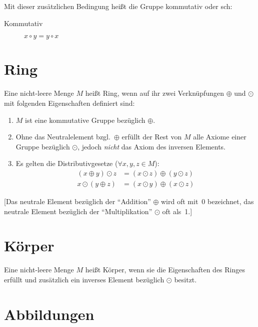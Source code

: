 Mit dieser zusätzlichen Bedingung heißt die Gruppe kommutativ oder sch:
\begin{description}
  \item [Kommutativ] 
	$x\circ y=y\circ x$
\end{description}

\section{Ring}

Eine nicht-leere Menge $M$ heißt Ring, wenn auf ihr zwei Verknüpfungen $\oplus$ und $\odot$ mit folgenden Eigenschaften definiert sind:

\begin{enumerate}
  \item $M$ ist eine kommutative Gruppe bezüglich $\oplus$.
  \item Ohne das Neutralelement bzgl.~$\oplus$ erfüllt der Rest von $M$ alle Axiome einer Gruppe bezüglich $\odot$, jedoch \emph{nicht} das Axiom des inversen Elements.
  \item Es gelten die Distributivgesetze ($\forall x,y,z\in M$):
	\begin{align*}
	  (x\oplus y)\odot z & =(x\odot z)\oplus(y\odot z)\\
	  x\odot(y\oplus z) & =(x\odot y)\oplus(x\odot z)
	\end{align*}
\end{enumerate}

[Das neutrale Element bezüglich der \enquote{Addition} $\oplus$ wird oft mit~0 bezeichnet, das neutrale Element bezüglich der \enquote{Multiplikation} $\odot$ oft als~1.]


\section{Körper}

Eine nicht-leere Menge $M$ heißt Körper, wenn sie die Eigenschaften des Ringes erfüllt und zusätzlich ein inverses Element bezüglich $\odot$ besitzt.


\section{Abbildungen}

